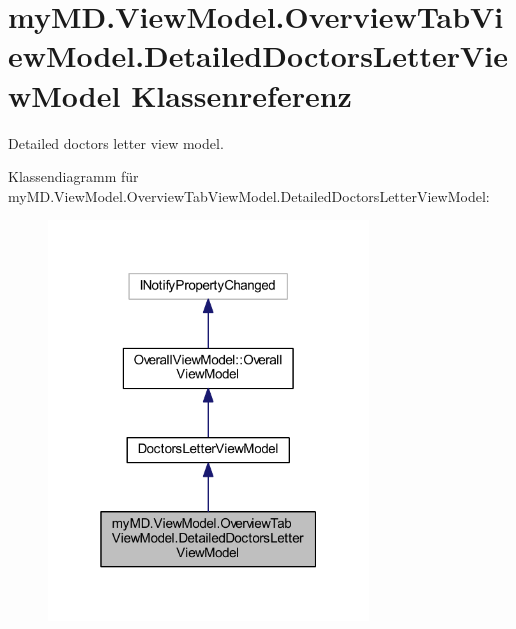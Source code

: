 \hypertarget{classmy_m_d_1_1_view_model_1_1_overview_tab_view_model_1_1_detailed_doctors_letter_view_model}{}\section{my\+M\+D.\+View\+Model.\+Overview\+Tab\+View\+Model.\+Detailed\+Doctors\+Letter\+View\+Model Klassenreferenz}
\label{classmy_m_d_1_1_view_model_1_1_overview_tab_view_model_1_1_detailed_doctors_letter_view_model}


Detailed doctors letter view model.  




Klassendiagramm für my\+M\+D.\+View\+Model.\+Overview\+Tab\+View\+Model.\+Detailed\+Doctors\+Letter\+View\+Model\+:\nopagebreak
\begin{figure}[H]
\begin{center}
\leavevmode
\includegraphics[width=241pt]{classmy_m_d_1_1_view_model_1_1_overview_tab_view_model_1_1_detailed_doctors_letter_view_model__inherit__graph}
\end{center}
\end{figure}


